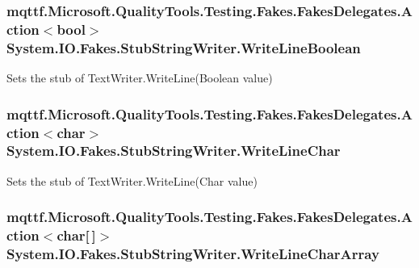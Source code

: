 \hypertarget{class_system_1_1_i_o_1_1_fakes_1_1_stub_string_writer_ac98149f7d123021aa29a85d39f9bc09b}{
\subsubsection[{Write\-Line\-Boolean}]{\setlength{\rightskip}{0pt plus 5cm}mqttf.\-Microsoft.\-Quality\-Tools.\-Testing.\-Fakes.\-Fakes\-Delegates.\-Action$<$bool$>$ System.\-I\-O.\-Fakes.\-Stub\-String\-Writer.\-Write\-Line\-Boolean}}\label{class_system_1_1_i_o_1_1_fakes_1_1_stub_string_writer_ac98149f7d123021aa29a85d39f9bc09b}


Sets the stub of Text\-Writer.\-Write\-Line(\-Boolean value)

\hypertarget{class_system_1_1_i_o_1_1_fakes_1_1_stub_string_writer_a64891147817ec32254d1fd7ca1e452de}{
\subsubsection[{Write\-Line\-Char}]{\setlength{\rightskip}{0pt plus 5cm}mqttf.\-Microsoft.\-Quality\-Tools.\-Testing.\-Fakes.\-Fakes\-Delegates.\-Action$<$char$>$ System.\-I\-O.\-Fakes.\-Stub\-String\-Writer.\-Write\-Line\-Char}}\label{class_system_1_1_i_o_1_1_fakes_1_1_stub_string_writer_a64891147817ec32254d1fd7ca1e452de}


Sets the stub of Text\-Writer.\-Write\-Line(\-Char value)

\hypertarget{class_system_1_1_i_o_1_1_fakes_1_1_stub_string_writer_a4385b7c340201c525bbc0903bf511be5}{
\subsubsection[{Write\-Line\-Char\-Array}]{\setlength{\rightskip}{0pt plus 5cm}mqttf.\-Microsoft.\-Quality\-Tools.\-Testing.\-Fakes.\-Fakes\-Delegates.\-Action$<$char\mbox{[}$\,$\mbox{]}$>$ System.\-I\-O.\-Fakes.\-Stub\-String\-Writer.\-Write\-Line\-Char\-Array}}\label{class_system_1_1_i_o_1_1_fakes_1_1_stub_string_writer_a4385b7c340201c525bbc0903bf511be5}


